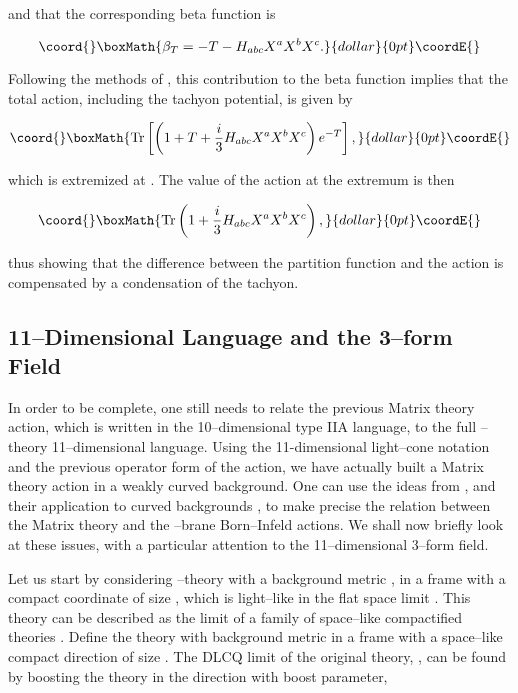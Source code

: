 \documentclass[a4paper,11pt]{article}
\begin{document}
\noindent
and that the corresponding beta function is

$$\coord{}\boxMath{
\beta _{T}=-T-H_{abc}X^a X^b X^c.
}{dollar}{0pt}\coordE{}$$

\noindent
Following the methods of \cite{Witten-BSFT, Shatashvili-BSFT, 
Tseytlin-BSFT}, this contribution to the beta function implies that the 
total action, including the tachyon potential, is given by

$$\coord{}\boxMath{
{\rm Tr} \left[ \left( 1+T+\frac{i}{3}H_{abc} X^a X^b X^c \right) 
e^{-T} \right] ,
}{dollar}{0pt}\coordE{}$$

\noindent
which is extremized at \coordHE{}. The value
of the action at the extremum is then

$$\coord{}\boxMath{
{\rm Tr} \left(1+ \frac{i}{3}H_{abc} X^a X^b X^c\right) ,
}{dollar}{0pt}\coordE{}$$

\noindent
thus showing that the difference between the partition function and the
action is compensated by a condensation of the tachyon.


\subsection{11--Dimensional Language and the 3--form Field}


In order to be complete, one still needs to relate the previous Matrix
theory action, which is written in the 10--dimensional type IIA language,
to the full \coordHE{}--theory 11--dimensional language. Using the 11-dimensional
light--cone notation and the previous operator form of the action, we have
actually built a Matrix theory action in a weakly curved background.  One
can use the ideas from \cite{Sen, Seiberg}, and their application to curved
backgrounds \cite{Taylor-Raamsdonk-2}, to make precise the relation between
the Matrix theory and the \coordHE{}--brane Born--Infeld actions. We shall now
briefly look at these issues, with a particular attention to the
11--dimensional 3--form field.

Let us start by considering \coordHE{}--theory with a background metric \coordHE{},
in a frame with a compact coordinate \coordHE{} of size \coordHE{}, which is
light--like in the flat space limit \coordHE{}.  This theory
can be described as the limit of a family of space--like compactified
theories \cite{Sen, Seiberg}. Define the theory \coordHE{} with
background metric \coordHE{} in a frame with a space--like
compact direction \coordHE{} of size \coordHE{}. The DLCQ limit of the
original theory, \coordHE{}, can be found by boosting the theory \coordHE{}
in the \coordHE{} direction with boost parameter,
\end{document}
